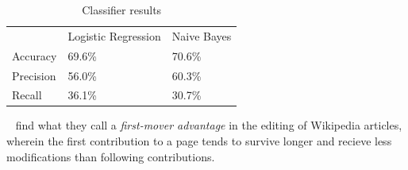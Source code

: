 \documentclass{iitthesis}
\begin{document}
\begin{table}[ht] \centering \label{tbl:classifiers}
  \caption{Classifier results}
  \begin{tabular}{lll}
  ~         & Logistic Regression & Naive Bayes \\
  Accuracy  & 69.6\%              & 70.6\%      \\
  Precision & 56.0\%              & 60.3\%      \\
  Recall    & 36.1\%              & 30.7\%      \\
  \end{tabular}
\end{table}



~\cite{viegas_studying_2004} find what they call a \textit{first-mover
advantage} in the editing of Wikipedia articles, wherein the first contribution
to a page tends to survive longer and recieve less modifications than following
contributions.


\clearpage


%
%

\appendix

%
%




\end{document}
